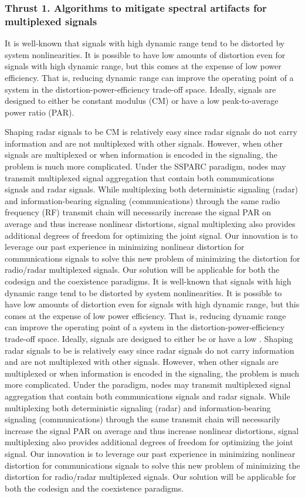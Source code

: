 \subsubsection{Thrust 1. Algorithms to mitigate spectral artifacts for multiplexed signals}
It is well-known that signals with high dynamic range tend to be distorted by system nonlinearities.  It is possible to have low amounts of distortion even for signals with high dynamic range, but this comes at the expense of low power efficiency.  That is, reducing dynamic range can improve the operating point of a system in the distortion-power-efficiency trade-off space. Ideally, signals are designed to either be constant modulus (CM) or have a low peak-to-average power ratio (PAR).

Shaping radar signals to be CM is relatively easy since radar signals do not carry information and are not multiplexed with other signals.  However, when other signals are multiplexed or when information is encoded in the signaling, the problem is much more complicated.  Under the SSPARC paradigm, nodes may transmit multiplexed signal aggregation that contain both communications signals and radar signals. 
While multiplexing both deterministic signaling (radar) and information-bearing signaling (communications) through the same radio frequency (RF) transmit chain will necessarily increase the signal PAR on average and thus increase nonlinear distortions, signal multiplexing also provides additional degrees of freedom for optimizing the joint signal.  Our innovation is to leverage our past experience in minimizing nonlinear distortion for communications signals to solve this new problem of minimizing the distortion for radio/radar multiplexed signals.  Our solution will be applicable for both the codesign and the coexistence paradigms.  
It is well-known that signals with high dynamic range tend to be distorted by system nonlinearities.  It is possible to have low amounts of distortion even for signals with high dynamic range, but this comes at the expense of low power efficiency.  That is, reducing dynamic range can improve the operating point of a system in the distortion-power-efficiency trade-off space. Ideally, signals are designed to either be \CM or have a low \PAR.
Shaping radar signals to be \CM is relatively easy since radar signals do not carry information and are not multiplexed with other signals.  However, when other signals are multiplexed or when information is encoded in the signaling, the problem is much more complicated.  Under the \SSPARC paradigm, nodes may transmit multiplexed signal aggregation that contain both communications signals and radar signals. 
While multiplexing both deterministic signaling (radar) and information-bearing signaling (communications) through the same \RF transmit chain will necessarily increase the signal PAR on average and thus increase nonlinear distortions, signal multiplexing also provides additional degrees of freedom for optimizing the joint signal.  Our innovation is to leverage our past experience in minimizing nonlinear distortion for communications signals to solve this new problem of minimizing the distortion for radio/radar multiplexed signals.  Our solution will be applicable for both the codesign and the coexistence paradigms.  

